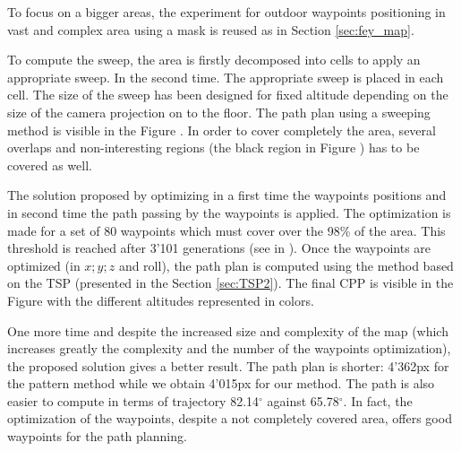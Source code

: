 To focus on a bigger areas, the experiment for outdoor waypoints positioning in vast and complex area using a mask  is reused as in Section \ref{sec:fey_map}. %

To compute the sweep, the area is firstly decomposed into cells to apply an appropriate sweep. In the second time. The appropriate sweep is placed in each cell. The size of the sweep has been designed for fixed altitude depending on the size of the camera projection on to the floor.%
The path plan using a sweeping method is visible in the Figure . In order to cover completely the area, several overlaps and non-interesting regions (the black region in Figure ) has to be covered as well. 

The solution proposed by optimizing in a first time the waypoints positions and in second time the path passing by the waypoints is applied. The optimization is made for a set of 80 waypoints which must cover over the 98\% of the area. This threshold is reached after 3'101 generations (see in ). Once the waypoints are optimized (in $x;y;z$ and roll), the path plan is computed using the method based on the TSP (presented in the Section \ref{sec:TSP2}). The final CPP is visible in the Figure  with the different altitudes represented in colors.

One more time and despite the increased size and complexity of the map (which increases greatly the complexity and the number of the waypoints optimization), the proposed solution gives a better result. The path plan is shorter: 4'362px for the pattern method while we obtain 4'015px for our method. The path is also easier to compute in terms of trajectory 82.14$^\circ$ against 65.78$^\circ$.
In fact, the optimization of the waypoints, despite a not completely covered area, offers good waypoints for the path planning. %

  

